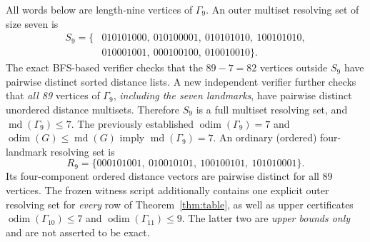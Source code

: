 \documentclass[10pt,a4paper]{article}
\newcommand{\odim}{\operatorname{odim}}
\newcommand{\md}{\operatorname{md}}
\newcommand{\G}{\Gamma}
\begin{document}
All words below are length-nine vertices of $\G_9$.
An outer multiset resolving set of size seven is
\begin{align*}
S_9=\{&010101000,\ 010100001,\ 010101010,\ 100101010,\\
&010001001,\ 000100100,\ 010010010\}.
\end{align*}
The exact BFS-based verifier checks that the $89-7=82$ vertices outside $S_9$
have pairwise distinct sorted distance lists. A new independent verifier further checks
that \emph{all 89} vertices of $\G_9$, \emph{including the seven landmarks},
have pairwise distinct unordered distance multisets. Therefore $S_9$ is a full
multiset resolving set, and $\md(\G_9)\le7$. The previously established
$\odim(\G_9)=7$ and $\odim(G)\le\md(G)$ imply $\md(\G_9)=7$.
An ordinary (ordered) four-landmark resolving set is
\[
R_9=\{000101001,\ 010010101,\ 100100101,\ 101010001\}.
\]
Its four-component ordered distance vectors are pairwise distinct for all $89$ vertices.
The frozen witness script additionally contains one explicit outer resolving set for
\emph{every} row of Theorem~\ref{thm:table}, as well as upper certificates
$\odim(\G_{10})\le7$ and $\odim(\G_{11})\le9$.
The latter two are \emph{upper bounds only} and are not asserted to be exact.
\end{document}
